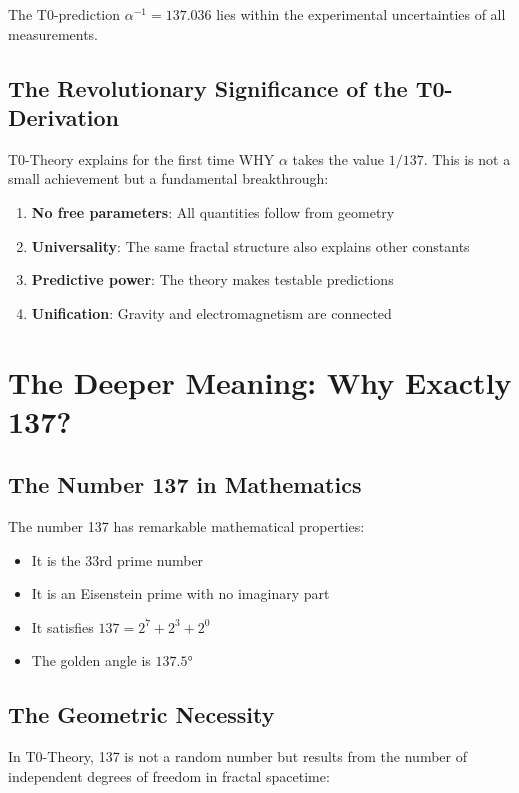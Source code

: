 \documentclass[12pt,a4paper]{article}
\theoremstyle{definition}
\begin{document}
	The T0-prediction $\alpha^{-1} = 137.036$ lies within the experimental uncertainties of all measurements.
	
	\subsection{The Revolutionary Significance of the T0-Derivation}
	
	T0-Theory explains for the first time WHY $\alpha$ takes the value $1/137$. This is not a small achievement but a fundamental breakthrough:
	
	\begin{enumerate}
		\item \textbf{No free parameters}: All quantities follow from geometry
		\item \textbf{Universality}: The same fractal structure also explains other constants
		\item \textbf{Predictive power}: The theory makes testable predictions
		\item \textbf{Unification}: Gravity and electromagnetism are connected
	\end{enumerate}
	
	\section{The Deeper Meaning: Why Exactly 137?}
	
	\subsection{The Number 137 in Mathematics}
	
	The number 137 has remarkable mathematical properties:
	
	\begin{itemize}
		\item It is the 33rd prime number
		\item It is an Eisenstein prime with no imaginary part
		\item It satisfies $137 = 2^7 + 2^3 + 2^0$
		\item The golden angle is $137.5°$
	\end{itemize}
	
	\subsection{The Geometric Necessity}
	
	In T0-Theory, 137 is not a random number but results from the number of independent degrees of freedom in fractal spacetime:
	
\end{document}
